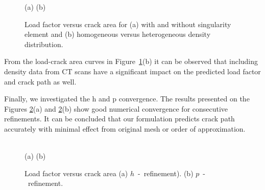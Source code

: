 \documentclass[twocolumn]{svjour3}
\begin{document}
\begin{figure}[h]
	\centering
	\begin{minipage}{.45\textwidth}
\end{minipage}%
\quad
\begin{minipage}{.45\textwidth}
\end{minipage}

(a) \hspace{5cm} (b)
	\caption{Load factor versus crack area for (a) with and without singularity element and (b) homogeneous versus heterogeneous density distribution.}
	\label{fig:load_factor1}
\end{figure}
From the load-crack area curves in Figure~\ref{fig:load_factor1}(b) it can be observed that including density data from CT scans have a significant impact on the predicted load factor and crack path as well. 


Finally, we investigated the h and p convergence. The results presented on the Figures \ref{fig:load_factor2}(a) and \ref{fig:load_factor2}(b) show good numerical convergence for consecutive refinements. It can be concluded that our formulation predicts crack path accurately with minimal effect from original mesh or order of approximation. 

\begin{figure}[h]
	\centering
	\begin{minipage}{.45\textwidth}
	\end{minipage}%
	\begin{minipage}{.45\textwidth}
	\end{minipage} \\
	(a)\hspace{5cm} (b)
			 \caption{Load factor versus crack area (a) $h$~-~refinement). (b) $p$~-~refinement.}
		 \label{fig:load_factor2}
	\end{figure}
\end{document}
